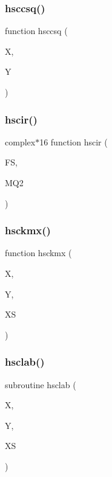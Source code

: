 \subsubsection{\texorpdfstring{hsccsq()}{hsccsq()}}
{\footnotesize\ttfamily function hsccsq (\begin{DoxyParamCaption}\item[{}]{X,  }\item[{}]{Y }\end{DoxyParamCaption})}

\mbox{\label{djangoh__h_8f_ae2c9b96a23af92b724c02469ce20e760}} 
\subsubsection{\texorpdfstring{hscir()}{hscir()}}
{\footnotesize\ttfamily complex$\ast$16 function hscir (\begin{DoxyParamCaption}\item[{}]{FS,  }\item[{}]{M\+Q2 }\end{DoxyParamCaption})}

\mbox{\label{djangoh__h_8f_a1f1037841cdf7240f24c90a08e9e7c32}} 
\subsubsection{\texorpdfstring{hsckmx()}{hsckmx()}}
{\footnotesize\ttfamily function hsckmx (\begin{DoxyParamCaption}\item[{}]{X,  }\item[{}]{Y,  }\item[{}]{XS }\end{DoxyParamCaption})}

\mbox{\label{djangoh__h_8f_a0f167b5c7522899e009979f4317b7a24}} 
\subsubsection{\texorpdfstring{hsclab()}{hsclab()}}
{\footnotesize\ttfamily subroutine hsclab (\begin{DoxyParamCaption}\item[{}]{X,  }\item[{}]{Y,  }\item[{}]{XS }\end{DoxyParamCaption})}



